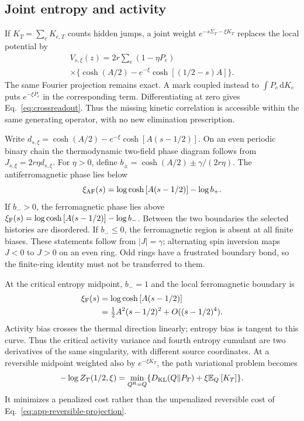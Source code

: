 \documentclass[aps,pre,reprint,amsmath,amssymb,longbibliography,floatfix]{revtex4-2}
\newcommand{\E}{\mathbb E}
\newcommand{\dd}{\,\mathrm d}
\newcommand{\KL}{D_{\mathrm{KL}}}
\begin{document}
\subsection{Joint entropy and activity}
If $K_T=\sum_eK_{e,T}$ counts hidden jumps, a joint weight
$e^{-s\Sigma_T-\xi K_T}$ replaces the local potential by
\begin{multline}
 V_{s,\xi}(z)=2r\sum_e(1-\eta P_e)\\
 \times\bigl\{\cosh(A/2)-e^{-\xi}\cosh\left[(1/2-s)A\right]\bigr\}.
 \label{eq:joint-hidden-marks}
\end{multline}
The same Fourier projection remains exact. A mark coupled instead to
$\int P_e\dd K_e$ puts $e^{-\xi P_e}$ in the corresponding term.
Differentiating at zero gives Eq.~\eqref{eq:crossreadout}. Thus the
missing kinetic correlation is accessible within the same generating
operator, with no new elimination prescription.

Write $d_{s,\xi}=\cosh(A/2)-e^{-\xi}\cosh\left[A(s-1/2)\right]$. On an even
periodic binary chain the thermodynamic two-field phase diagram follows from
$J_{s,\xi}=2r\eta d_{s,\xi}$. For $\eta>0$, define
$b_\pm=\cosh(A/2)\pm\gamma/(2r\eta)$. The antiferromagnetic phase lies
below
\begin{equation}
 \xi_{\rm AF}(s)=\log\cosh\left[A(s-1/2)\right]-\log b_+.
 \label{eq:joint-AF}
\end{equation}
If $b_->0$, the ferromagnetic phase lies above
$\xi_{\rm F}(s)=\log\cosh\left[A(s-1/2)\right]-\log b_-$.
Between the two boundaries the selected histories are disordered.
If $b_-\le0$, the ferromagnetic region is absent at all finite biases.
These statements follow from $|J|=\gamma$; alternating spin inversion
maps $J<0$ to $J>0$ on an even ring. Odd rings have a frustrated boundary
bond, so the finite-ring identity must not be transferred to them.

At the critical entropy midpoint, $b_-=1$ and the local ferromagnetic
boundary is
\begin{equation}
 \begin{aligned}
 \xi_{\rm F}(s)&=\log\cosh\left[A(s-1/2)\right]\\
 &=\tfrac12A^2(s-1/2)^2+O((s-1/2)^4).
 \end{aligned}
 \label{eq:curved-critical-boundary}
\end{equation}
Activity bias crosses the thermal direction linearly; entropy bias is
tangent to this curve. Thus the critical activity variance and fourth
entropy cumulant are two derivatives of the same singularity, with
different source coordinates. At a reversible midpoint weighted also
by $e^{-\xi K_T}$, the path variational problem becomes
\begin{equation}
 -\log Z_T(1/2,\xi)
 =\min_{Q^{\rm R}=Q}\{\KL(Q\Vert P_T)+\xi\E_Q\left[K_T\right]\}.
 \label{eq:activity-reversible-cost}
\end{equation}
It minimizes a penalized cost rather than the unpenalized reversible
cost of Eq.~\eqref{eq:app-reversible-projection}.
\end{document}
